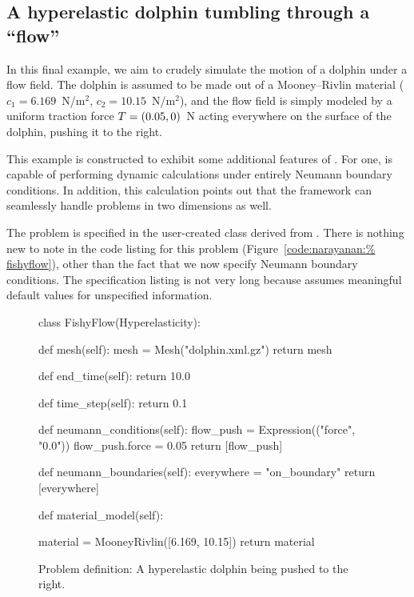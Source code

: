\subsection{A hyperelastic dolphin tumbling through a ``flow''}

In this final example, we aim to crudely simulate the motion of a
dolphin under a flow field. The dolphin is assumed to be made out of a
Mooney--Rivlin material ($c_{1} = 6.169$~N/m$^2$, $c_{2} =
10.15$~N/m$^2$), and the flow field is simply modeled by a uniform
traction force $\mbox{$ T$} = (0.05, 0)$~N acting everywhere on the surface of
the dolphin, pushing it to the right.

This example is constructed to exhibit some additional features of
\twist. For one, \twist{} is capable of performing dynamic calculations
under entirely Neumann boundary conditions. In addition, this
calculation points out that the framework can seamlessly handle
problems in two dimensions as well.

The problem is specified in the user-created class 
derived from . There is nothing new to note in
the code listing for this problem (Figure~\ref{code:narayanan:%
fishyflow}), other than the fact that we now specify Neumann boundary
conditions. The specification listing is not very long because
\twist{} assumes meaningful default values for unspecified
information.

\begin{figure}
\begin{python}
class FishyFlow(Hyperelasticity):

    def mesh(self):
        mesh = Mesh("dolphin.xml.gz")
        return mesh

    def end_time(self):
        return 10.0

    def time_step(self):
        return 0.1

    def neumann_conditions(self):
        flow_push = Expression(("force", "0.0"))
        flow_push.force = 0.05
        return [flow_push]

    def neumann_boundaries(self):
        everywhere = "on_boundary"
        return [everywhere]

    def material_model(self):

        material = MooneyRivlin([6.169, 10.15])
        return material
\end{python}
\caption{Problem definition: A hyperelastic dolphin being pushed to
  the right.}
\label{code:narayanan:fishyflow}
\end{figure}

